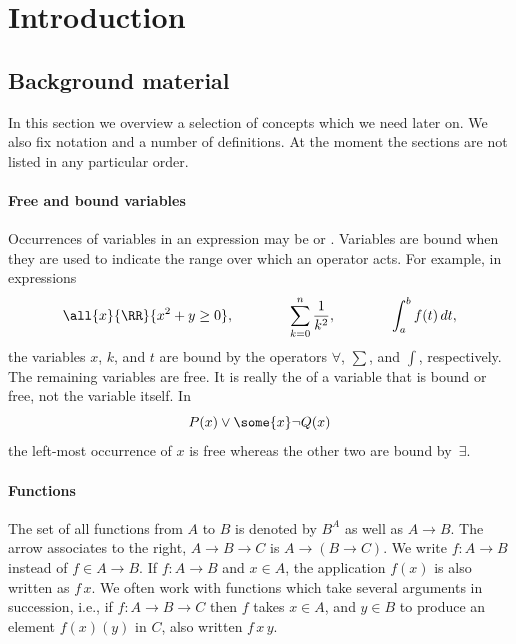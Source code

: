 \chapter{Introduction}
\label{chap:introduction}

\section{Background material}
\label{sec:background-material}

In this section we overview a selection of concepts which we need
later on. We also fix notation and a number of definitions. At the
moment the sections are not listed in any particular order.

\subsubsection*{Free and bound variables}

Occurrences of variables in an expression may be  or
. Variables are bound when they are used to indicate the
range over which an operator acts. For example, in expressions
%
\begin{equation*}
  \all{x}{\RR}{x^2 + y \geq 0},
  \qquad\qquad
  \sum_{k = 0}^n \frac{1}{k^2},
  \qquad\qquad
  \int_a^b f(t) \, dt,
\end{equation*}
%
the variables $x$, $k$, and $t$ are bound by the operators $\forall$,
$\sum$, and $\int$, respectively. The remaining variables are free. It
is really the  of a variable that is bound or free,
not the variable itself. In
%
\begin{equation*}
  P(x) \lor \some{x} \lnot Q(x)
\end{equation*}
%
the left-most occurrence of $x$ is free whereas the other two are bound
by~$\exists$.

\subsubsection*{Functions}

The set of all functions from $A$ to $B$ is denoted by $B^A$ as well as $A \to B$. The arrow associates to the right,
$A \to B \to C$ is $A \to (B \to C)$. We write $f : A \to B$ instead of $f \in A \to B$. If $f : A \to B$ and $x \in A$, the application $f(x)$ is also written as $f\, x$. We often work with  functions which take several
arguments in succession, i.e., if $f : A \to B \to C$ then $f$ takes $x \in A$, and $y \in B$ to produce an element
$f(x)(y)$ in $C$, also written $f\, x\, y$.


